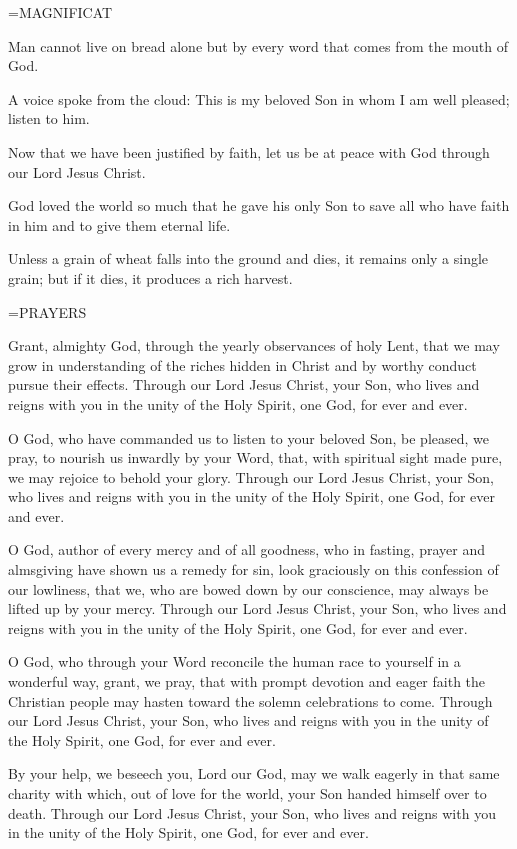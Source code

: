 \hangindent=\parindent \small MAGNIFICAT
\begin{description}[labelindent=\parindent, leftmargin=*]
\item [Week 1:] 	Man cannot live on bread alone but by every word that comes from the mouth of God.
\item [Week 2:] 	A voice spoke from the cloud: This is my beloved Son in whom I am well pleased; listen to him.
\item [Week 3:] 	Now that we have been justified by faith, let us be at peace with God through our Lord Jesus Christ.
\item [Week 4:] 	God loved the world so much that he gave his only Son to save all who have faith in him and to give them eternal life.
\item [Week 5:] 	Unless a grain of wheat falls into the ground and dies, it remains only a single grain; but if it dies, it produces a rich harvest.
\end{description}

\hangindent=\parindent \small PRAYERS
\begin{description}[labelindent=\parindent, leftmargin=*]
\item [Week 1:] 	Grant, almighty God, through the yearly observances of holy Lent, that we may grow in understanding of the riches hidden in Christ and by worthy conduct pursue their effects. Through our Lord Jesus Christ, your Son, who lives and reigns with you in the unity of the Holy Spirit, one God, for ever and ever.
\item [Week 2:] 	O God, who have commanded us to listen to your beloved Son, be pleased, we pray, to nourish us inwardly by your Word, that, with spiritual sight made pure, we may rejoice to behold your glory. Through our Lord Jesus Christ, your Son, who lives and reigns with you in the unity of the Holy Spirit, one God, for ever and ever.
\item [Week 3:] 	O God, author of every mercy and of all goodness, who in fasting, prayer and almsgiving have shown us a remedy for sin, look graciously on this confession of our lowliness, that we, who are bowed down by our conscience, may always be lifted up by your mercy. Through our Lord Jesus Christ, your Son, who lives and reigns with you in the unity of the Holy Spirit, one God, for ever and ever.
\item [Week 4:] 	O God, who through your Word reconcile the human race to yourself in a wonderful way, grant, we pray, that with prompt devotion and eager faith the Christian people may hasten toward the solemn celebrations to come. Through our Lord Jesus Christ, your Son, who lives and reigns with you in the unity of the Holy Spirit, one God, for ever and ever.
\item [Week 5:] 	By your help, we beseech you, Lord our God, may we walk eagerly in that same charity with which, out of love for the world, your Son handed himself over to death. Through our Lord Jesus Christ, your Son, who lives and reigns with you in the unity of the Holy Spirit, one God, for ever and ever.
\end{description}

